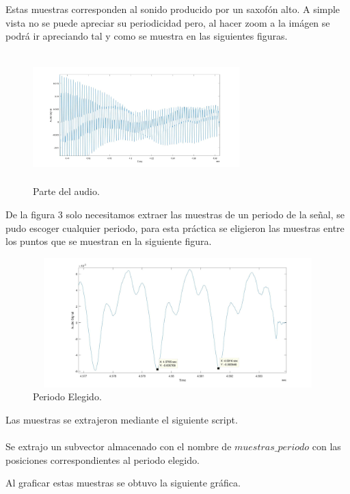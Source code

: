 \documentclass[12pt]{article}
\begin{document}
Estas muestras corresponden al sonido producido por un saxofón alto. A simple vista no se puede apreciar su periodicidad pero, al hacer zoom a la imágen se podrá ir apreciando tal y como se muestra en las siguientes figuras.

\begin{figure}[h]
    \centering
        \includegraphics[width=8cm,height=5cm]{untitled.jpg}
        \caption{Parte del audio.}
\end{figure}

De la figura 3 solo necesitamos extraer las muestras de un periodo de la señal, se pudo escoger cualquier periodo, para esta práctica se eligieron las muestras entre los puntos que se muestran en la siguiente figura.

\vspace{19mm}
\begin{figure}[h]
    \centering
        \includegraphics[width=15cm,height=5cm]{tamano_vector.jpg}
        \caption{Periodo Elegido.}
\end{figure}

Las muestras se extrajeron mediante el siguiente script.
\\
\\


Se extrajo un subvector almacenado con el nombre de $muestras\_periodo$ con las posiciones correspondientes al periodo elegido.

Al graficar estas muestras se obtuvo la siguiente gráfica.
\end{document}
